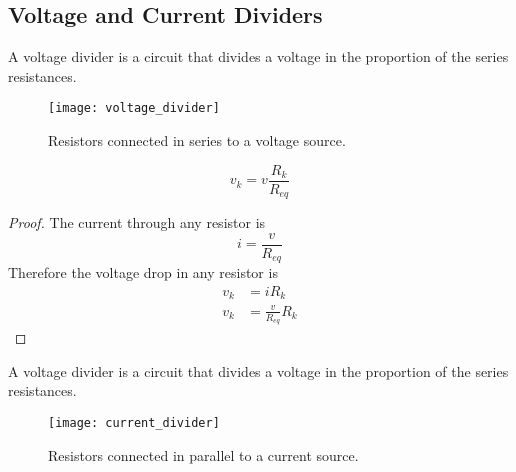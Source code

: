 \documentclass{article}
\begin{document}
\subsection{Voltage and Current Dividers}
\begin{definition}
    A voltage divider is a circuit that divides a voltage in the proportion of the series resistances.
\end{definition}
\begin{figure}[H]
    \centering
    \texttt{[image: voltage\_divider]}
    \caption{Resistors connected in series to a voltage source.}
\end{figure}
\begin{theorem}
    \begin{equation*}
        v_k = v \frac{R_k}{R_{eq}}
    \end{equation*}
\end{theorem}
\begin{proof}
    The current through any resistor is
    \begin{equation*}
        i = \frac{v}{R_{eq}}
    \end{equation*}
    Therefore the voltage drop in any resistor is
    \begin{align*}
        v_k &= i R_k \\
        v_k &= \frac{v}{R_{eq}} R_k
    \end{align*}
\end{proof}
\begin{definition}
    A voltage divider is a circuit that divides a voltage in the proportion of the series resistances.
\end{definition}
\begin{figure}[H]
    \centering
    \texttt{[image: current\_divider]}
    \caption{Resistors connected in parallel to a current source.}
\end{figure}
\end{document}
